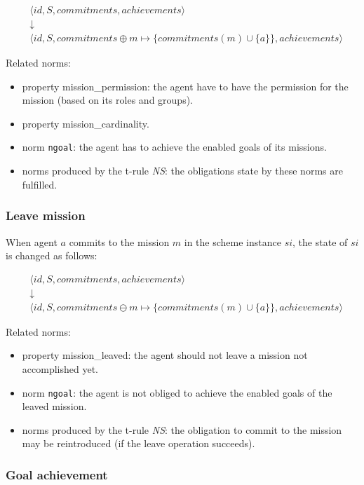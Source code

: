 \documentclass{article}
\newcommand{\code}[1]{\texttt{#1}}
\newcommand{\rwlabel}[1]{{\scshape\itshape\textrm{#1}}}
\theoremstyle{definition} \newtheorem{definition}{Definition}
\begin{document}
\begin{eqnarray*}
& \langle id, S, commitments, achievements \rangle \\
&  \downarrow \\
& \langle id, S, commitments  \oplus m \mapsto \{ commitments(m) \cup \{a\} \}, achievements \rangle
\end{eqnarray*}

Related norms:
\begin{itemize}
\item property mission\_permission: the agent have to have the
  permission for the mission (based on its roles and groups).
\item property mission\_cardinality.
\item norm \code{ngoal}: the agent has to achieve the enabled goals of
  its missions.
\item norms produced by the t-rule \rwlabel{NS}: the obligations state
  by these norms are fulfilled.
\end{itemize}

\subsubsection{Leave mission}

When agent $a$ commits to the mission $m$ in the scheme instance $si$, the
state of $si$ is changed as follows:

\begin{eqnarray*}
& \langle id, S, commitments, achievements \rangle \\
&  \downarrow \\
& \langle id, S, commitments  \ominus m \mapsto \{ commitments(m) \cup \{a\} \}, achievements \rangle
\end{eqnarray*}

Related norms:
\begin{itemize}
\item property mission\_leaved: the agent should not leave a mission
  not accomplished yet.
\item norm \code{ngoal}: the agent is not obliged to achieve the enabled
  goals of the leaved mission.
\item norms produced by the t-rule \rwlabel{NS}: the obligation to
  commit to the mission may be reintroduced (if the leave operation
  succeeds).
\end{itemize}


\subsubsection{Goal achievement}
\end{document}
